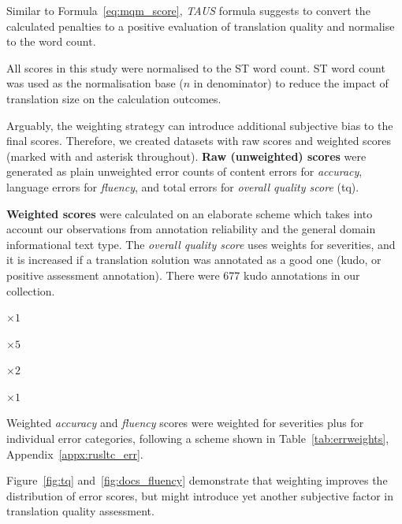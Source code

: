Similar to Formula~\ref{eq:mqm_score}, \textit{TAUS} formula suggests to convert the calculated penalties to a positive evaluation of translation quality and normalise to the word count.

All scores in this study were normalised to the ST word count. ST word count was used as the normalisation base ($n$ in denominator) to reduce the impact of translation size on the calculation outcomes.

Arguably, the weighting strategy can introduce additional subjective bias to the final scores. Therefore, we created datasets with raw scores and weighted scores (marked with and asterisk throughout). 
\label{pg:tq}
\textbf{Raw (unweighted) scores} were generated as plain unweighted error counts of content errors for \textit{accuracy}, language errors for \textit{fluency}, and total errors for \textit{overall quality score} (tq). 

\textbf{Weighted scores} were calculated on an elaborate scheme which takes into account our observations from annotation reliability and the general domain informational text type. The \textit{overall quality score} uses weights for severities, and it is increased if a translation solution was annotated as a good one (kudo, or positive assessment annotation). There were 677 kudo annotations in our collection.

\begin{description}\compresslist{}
	\item[kudos] $\times 1$
	\item[critical errors] $\times 5$
	\item[major errors] $\times 2$ 
	\item[minor errors] $\times 1$
\end{description}

Weighted \textit{accuracy} and \textit{fluency} scores were weighted for severities plus for individual error categories, following a scheme shown in Table~\ref{tab:errweights}, Appendix~\ref{appx:rusltc_err}.

Figure~\ref{fig:tq} and~\ref{fig:docs_fluency} demonstrate that weighting improves the distribution of error scores, but might introduce yet another subjective factor in translation quality assessment. 

